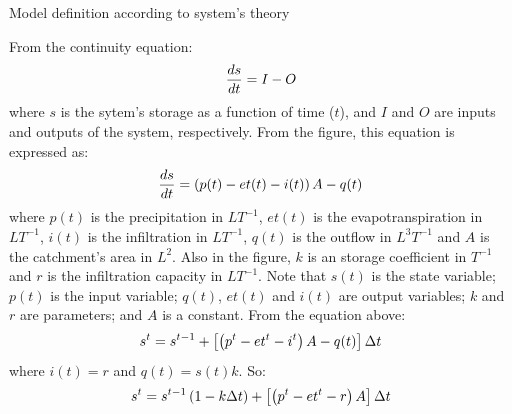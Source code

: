 \documentclass[8pt]{beamer}
\begin{document}
\begin{frame}{Model definition according to system's theory}
    \begin{minipage}{0.495\textwidth}
    From the continuity equation:
\vspace{-5pt}
$$
    \frac{ds}{dt} = I - O
\vspace{-5pt}
$$
    where $s$ is the sytem's storage as a function of time ($t$),  and $I$ and $O$ are inputs and outputs of the system, respectively. From the figure, this equation is expressed as:
\vspace{-5pt}
    $$
    \frac{ds}{dt} = \left( p(t) - et(t) - i(t)\right)A - q(t)
\vspace{-5pt}
    $$
    where $p(t)$ is the precipitation in $L T^{-1}$, $et(t)$ is the evapotranspiration  in $L T^{-1}$, $i(t)$ is the infiltration in $L T^{-1}$, $q(t)$ is the outflow in $L^{3} T^{-1}$ and $A$ is the catchment's area in $L^{2}$. Also in the figure, $k$ is an storage coefficient in $T^{-1}$ and $r$ is the infiltration capacity in $L T^{-1}$.
    Note that $s(t)$ is the \alert{state variable}; $p(t)$ is the \alert{input variable}; $q(t)$, $et(t)$ and $i(t)$ are  \alert{output variables}; $k$ and $r$ are \alert{parameters}; and $A$ is a \alert{constant}. From the equation above:
\vspace{-5pt}
$$
s^t = s^{t-1} + \left[ \left( p^{t} - et^{t}  - i^{t} \right) A - q(t) \right] \Delta t
\vspace{-5pt}
$$
where $i(t)= r$ and $q(t)=s(t) k$. So:
\vspace{-5pt}
$$
s^t = s^{t-1}\left(1-k\Delta t \right) + \left[ \left( p^{t} - et^{t}  - r \right) A \right] \Delta t
\vspace{-5pt}
$$
\end{minipage}
\hfill
\begin{minipage}{0.495\textwidth}
    \centering

\end{minipage}
\end{frame}
\end{document}
